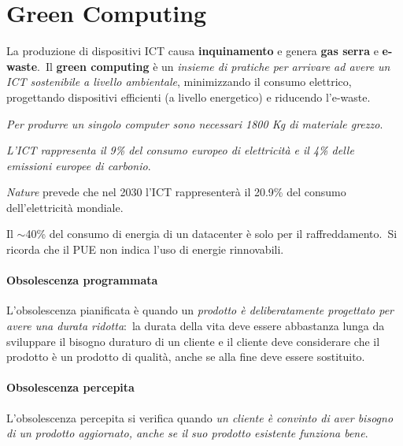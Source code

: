 \chapter{Green Computing}

La produzione di dispositivi ICT causa \textbf{inquinamento} e genera \textbf{gas serra} e \textbf{e-waste}.\
Il \textbf{green computing} è un \textit{insieme di pratiche per arrivare ad avere un ICT sostenibile a livello ambientale}, minimizzando il consumo elettrico, progettando dispositivi efficienti (a livello energetico) e riducendo l'e-waste.\

\begin{flushleft}
	\textit{Per produrre un singolo computer sono necessari 1800 Kg di materiale grezzo}.\quad [\texttt{news.un.org}]
\end{flushleft}

\begin{flushleft}
	\textit{L'ICT rappresenta il 9\% del consumo europeo di elettricità e il 4\% delle emissioni europee di carbonio}.\quad [\texttt{ictfootprint.eu}]
\end{flushleft}

\noindent \textit{Nature} prevede che nel 2030 l'ICT rappresenterà il 20.9\% del consumo dell'elettricità mondiale.

Il $\sim$40\% del consumo di energia di un datacenter è solo per il raffreddamento.\
Si ricorda che il PUE non indica l'uso di energie rinnovabili.


\subsubsection{Obsolescenza programmata}

L'obsolescenza pianificata è quando un \textit{prodotto è deliberatamente progettato per avere una durata ridotta}:\ la durata della vita deve essere abbastanza lunga da sviluppare il bisogno duraturo di un cliente e il cliente deve considerare che il prodotto è un prodotto di qualità, anche se alla fine deve essere sostituito.

\subsubsection{Obsolescenza percepita}

L'obsolescenza percepita si verifica quando \textit{un cliente è convinto di aver bisogno di un prodotto aggiornato, anche se il suo prodotto esistente funziona bene}.


